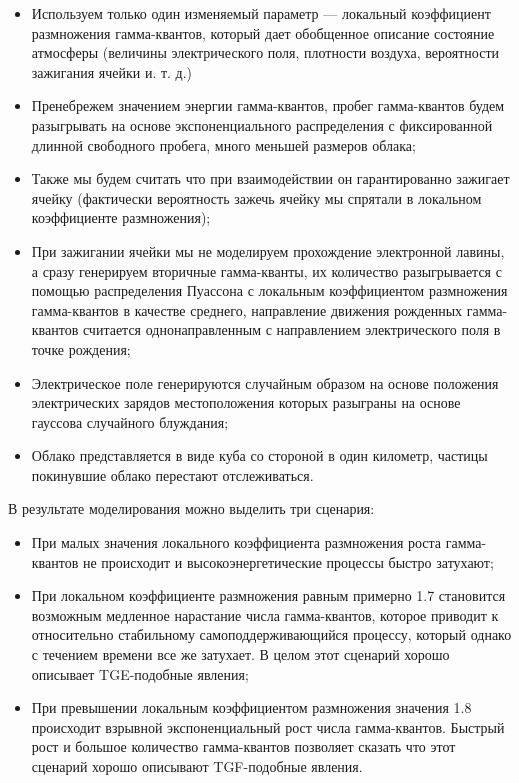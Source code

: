 \begin{itemize}
    \item Используем только один изменяемый параметр --- локальный коэффициент размножения гамма-квантов, который дает обобщенное описание состояние атмосферы (величины электрического поля, плотности воздуха, вероятности зажигания ячейки и. т. д.)
    \item  Пренебрежем значением энергии гамма-квантов, пробег гамма-квантов будем разыгрывать на основе экспоненциального распределения с фиксированной длинной свободного пробега, много меньшей размеров облака;
    \item Также мы будем считать что при взаимодействии он гарантированно зажигает ячейку (фактически вероятность зажечь ячейку мы спрятали в локальном коэффициенте размножения);
    \item При зажигании ячейки мы не моделируем прохождение электронной лавины, а сразу генерируем вторичные гамма-кванты, их количество разыгрывается с помощью распределения Пуассона с локальным коэффициентом размножения гамма-квантов в качестве среднего, направление движения рожденных гамма-квантов считается однонаправленным с направлением электрического поля в точке рождения;
    \item Электрическое поле генерируются случайным образом на основе положения электрических зарядов местоположения которых разыграны на основе гауссова случайного блуждания;
    \item Облако представляется в виде куба со стороной в один километр, частицы покинувшие облако перестают отслеживаться.
\end{itemize}

В результате моделирования можно выделить три сценария: 
\begin{itemize}
    \item При малых значения локального коэффициента размножения роста гамма-квантов не происходит и высокоэнергетические процессы быстро затухают;
    \item При локальном коэффициенте размножения равным примерно 1.7 становится возможным медленное нарастание числа гамма-квантов, которое приводит к относительно стабильному самоподдерживающийся процессу, который однако с течением времени все же затухает. В целом этот сценарий хорошо описывает TGE-подобные явления;
    \item При превышении локальным коэффициентом размножения значения 1.8 происходит взрывной экспоненциальный рост числа гамма-квантов. Быстрый рост и большое количество гамма-квантов позволяет сказать что этот сценарий хорошо описывают TGF-подобные явления.
\end{itemize}

